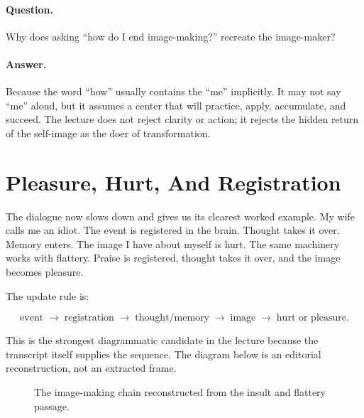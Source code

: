 \paragraph{Question.}
Why does asking ``how do I end image-making?'' recreate the image-maker?

\paragraph{Answer.}
Because the word ``how'' usually contains the ``me'' implicitly. It may not say ``me'' aloud, but it assumes a center that will practice, apply, accumulate, and succeed. The lecture does not reject clarity or action; it rejects the hidden return of the self-image as the doer of transformation.

\section{Pleasure, Hurt, And Registration}

The dialogue now slows down and gives us its clearest worked example. My wife calls me an idiot. The event is registered in the brain. Thought takes it over. Memory enters. The image I have about myself is hurt. The same machinery works with flattery. Praise is registered, thought takes it over, and the image becomes pleasure.

The update rule is:

\begin{equation}
\text{event}
\;\longrightarrow\;
\text{registration}
\;\longrightarrow\;
\text{thought/memory}
\;\longrightarrow\;
\text{image}
\;\longrightarrow\;
\text{hurt or pleasure}.
\end{equation}

This is the strongest diagrammatic candidate in the lecture because the transcript itself supplies the sequence. The diagram below is an editorial reconstruction, not an extracted frame.

\begin{figure}
\centering
{}
\caption{The image-making chain reconstructed from the insult and flattery passage.}
\end{figure}

